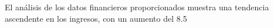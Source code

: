 

El análisis de los datos financieros proporcionados muestra una tendencia ascendente en los ingresos, con un aumento del 8.5%